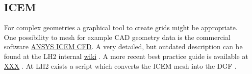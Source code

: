 \subsection{ICEM}
For complex geometries a graphical tool to create grids might be appropriate. One possibility to mesh for example CAD
geometry data is the commercial software \href{http://www.ansys.com/Products/Other+Products/ANSYS+ICEM+CFD/}{ANSYS ICEM
CFD}. A very detailed, but outdated description can be found at the LH2 internal \href{http://www.hydrosys.uni
-stuttgart.de/Intern/tiki/tiki-index.php?page=Netzgenerierung}{wiki} . A more recent best practice guide is available at
\url{XXX} . At LH2 exists a script which converts the ICEM mesh into the DGF .
